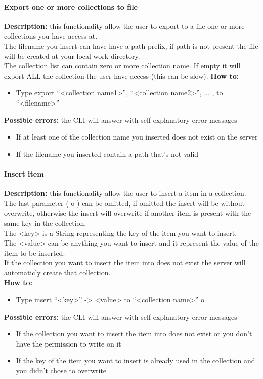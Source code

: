 \documentclass{scalatekids-article}
\begin{document}
\paragraph{Export one or more collections to file}
\label{sec:export}
\textbf{Description:} this functionality allow the user to export to a file one or more collections you have access at.\\
The filename you insert can have have a path prefix, if path is not present the file will be created at your local work directory.\\
The collection list can contain zero or more collection name. If empty it will export ALL the collection the user have access (this can be slow).
\textbf{How to:} 
\begin{itemize}
	\item Type export ``<collection name1>'', ``<collection name2>'', ... , to ``<filename>''
\end{itemize}
\textbf{Possible errors:} the CLI will answer with self explanatory error messages 
\begin{itemize}
	\item If at least one of the collection name you inserted does not exist on the server
	\item If the filename you inserted contain a path that's not valid
\end{itemize}

\paragraph{Insert item}
\label{sec:insertitem}
\textbf{Description:} this functionality allow the user to insert a item in a collection.\\
The last parameter ( o ) can be omitted, if omitted the insert will be without overwrite, otherwise the insert will overwrite if another item is present with the same key in the collection.\\
The <key> is a String representing the key of the item you want to insert.\\
The <value> can be anything you want to insert and it represent the value of the item to be inserted.\\
If the collection you want to insert the item into does not exist the server 
will automaticly create that collection.\\
\textbf{How to:} 
\begin{itemize}
	\item Type insert ``<key>'' -> <value> to ``<collection name>'' o
\end{itemize}
\textbf{Possible errors:} the CLI will answer with self explanatory error messages 
\begin{itemize}
	\item If the collection you want to insert the item into does not exist or you don't have the permission to write on it
	\item If the key of the item you want to insert is already used in the collection and you didn't chose to overwrite  
\end{itemize}
\end{document}
